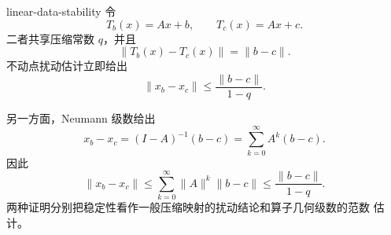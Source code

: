 \begin{solution}{linear-data-stability}
令
\[
 T_b(x)=Ax+b,\qquad T_c(x)=Ax+c.
\]
二者共享压缩常数 \(q\)，并且
\[
 \|T_b(x)-T_c(x)\|=\|b-c\|.
\]
不动点扰动估计立即给出
\[
 \|x_b-x_c\|\le\frac{\|b-c\|}{1-q}.
\]

另一方面，Neumann 级数给出
\[
 x_b-x_c=(I-A)^{-1}(b-c)
 =\sum_{k=0}^{\infty}A^k(b-c).
\]
因此
\[
 \|x_b-x_c\|
 \le\sum_{k=0}^{\infty}\|A\|^k\|b-c\|
 \le\frac{\|b-c\|}{1-q}.
\]
两种证明分别把稳定性看作一般压缩映射的扰动结论和算子几何级数的范数
估计。
\end{solution}
